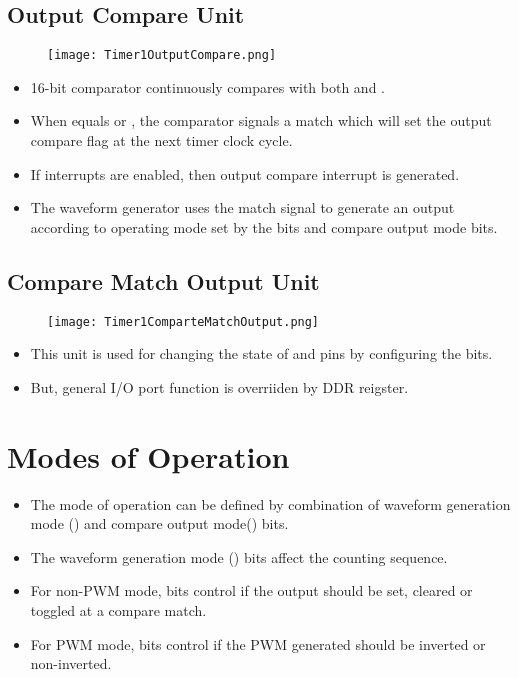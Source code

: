 \documentclass{article}
\begin{document}
\subsection{Output Compare Unit}
\begin{figure}[H]
    \begin{center}
        \texttt{[image: Timer1OutputCompare.png]}
    \end{center}
\end{figure}
\begin{itemize}
    \item 16-bit comparator continuously compares  with both  and .
    \item When  equals  or , the comparator signals a match which will set the output compare flag at the next timer clock cycle.
    \item If interrupts are enabled, then output compare interrupt is generated.
    \item The waveform generator uses the match signal to generate an output according to operating mode set by the  bits and compare output mode  bits.
\end{itemize}

\subsection{Compare Match Output Unit}
\begin{figure}[H]
    \begin{center}
        \texttt{[image: Timer1ComparteMatchOutput.png]}
    \end{center}
\end{figure}
\begin{itemize}
    \item This unit is used for changing the state of  and  pins by configuring the  bits.
    \item But, general I/O port function is overriiden by DDR reigster.
\end{itemize}


\section{Modes of Operation}
\begin{itemize}
    \item The mode of operation can be defined by combination of waveform generation mode () and compare output mode() bits.
    \item The waveform generation mode () bits affect the counting sequence.
    \item For non-PWM mode,  bits control if the output should be set, cleared or toggled at a compare match.
    \item For PWM mode,  bits control if the PWM generated should be inverted or non-inverted.
\end{itemize}
\end{document}
